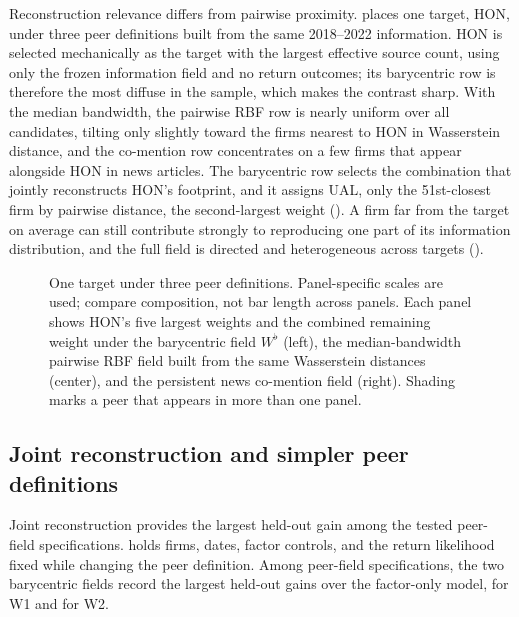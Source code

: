 Reconstruction relevance differs from pairwise proximity.
 places one target, HON, under three peer
definitions built from the same 2018--2022 information.
HON is selected mechanically as the target with the largest effective source
count, using only the frozen information field and no return outcomes; its
barycentric row is therefore the most diffuse in the sample, which makes the
contrast sharp. With the median bandwidth, the pairwise RBF row is nearly
uniform over all candidates, tilting only slightly toward the firms nearest
to HON in Wasserstein distance, and the co-mention row concentrates on a few
firms that appear alongside HON in news articles. The barycentric row selects
the combination that jointly reconstructs HON's footprint, and it assigns
UAL, only the 51st-closest firm by
pairwise distance, the second-largest weight
().
A firm far from the target on average can still contribute strongly to
reproducing one part of its information distribution, and the full field is
directed and heterogeneous across targets
().

\begin{figure}[htbp]
  \centering
  \caption{One target under three peer definitions. Panel-specific scales are
    used; compare composition, not bar length across panels. Each
    panel shows HON's
    five largest weights and the combined remaining weight under the
    barycentric field $W^\flat$ (left), the median-bandwidth pairwise
    RBF field built
    from the same Wasserstein distances (center), and the persistent news
    co-mention field (right). Shading marks
  a peer that appears in more than one panel.}
  \label{fig:peer-definitions}
\end{figure}

\subsection{Joint reconstruction and simpler peer definitions}
\label{sec:results-horse-race}

Joint reconstruction provides the largest held-out gain among the tested
peer-field specifications.
 holds firms, dates, factor controls,
and the return likelihood fixed while changing the peer definition.
Among peer-field specifications, the two barycentric fields record the largest
held-out gains over the factor-only model,
 for W1 and
 for W2.

